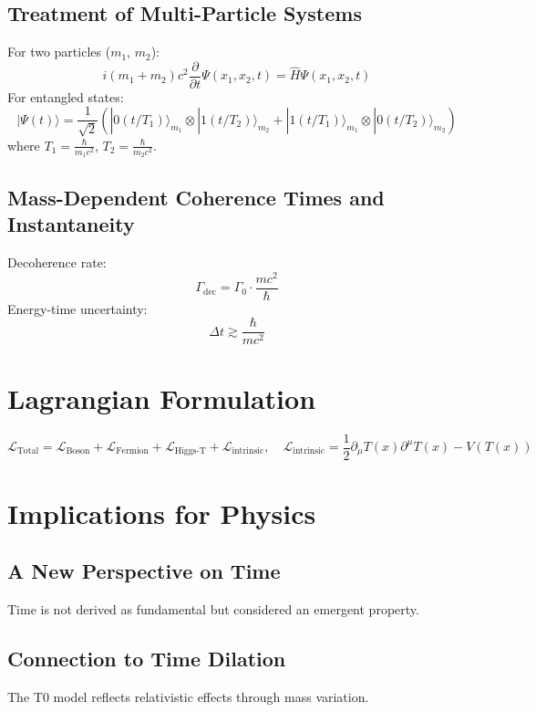 \documentclass[12pt,a4paper]{article}
\newcommand{\Tfield}{T(x)}
\begin{document}
	\subsection{Treatment of Multi-Particle Systems}
	For two particles (\( m_1 \), \( m_2 \)):
	\begin{equation}
		i (m_1 + m_2) c^2 \frac{\partial}{\partial t} \Psi(x_1, x_2, t) = \hat{H} \Psi(x_1, x_2, t)
	\end{equation}
	For entangled states:
	\begin{equation}
		|\Psi(t)\rangle = \frac{1}{\sqrt{2}}(|0(t/T_1)\rangle_{m_1} \otimes |1(t/T_2)\rangle_{m_2} + |1(t/T_1)\rangle_{m_1} \otimes |0(t/T_2)\rangle_{m_2})
	\end{equation}
	where \( T_1 = \frac{\hbar}{m_1 c^2} \), \( T_2 = \frac{\hbar}{m_2 c^2} \).
	
	\subsection{Mass-Dependent Coherence Times and Instantaneity}
	Decoherence rate:
	\begin{equation}
		\Gamma_{\text{dec}} = \Gamma_0 \cdot \frac{m c^2}{\hbar}
	\end{equation}
	Energy-time uncertainty:
	\begin{equation}
		\Delta t \gtrsim \frac{\hbar}{mc^2}
	\end{equation}
	
	\section{Lagrangian Formulation}
	\begin{equation}
		\mathcal{L}_{\text{Total}} = \mathcal{L}_{\text{Boson}} + \mathcal{L}_{\text{Fermion}} + \mathcal{L}_{\text{Higgs-T}} + \mathcal{L}_{\text{intrinsic}}, \quad \mathcal{L}_{\text{intrinsic}} = \frac{1}{2} \partial_\mu \Tfield \partial^\mu \Tfield - V(\Tfield)
	\end{equation}
	
	\section{Implications for Physics}
	\subsection{A New Perspective on Time}
	Time is not derived as fundamental but considered an emergent property.
	\subsection{Connection to Time Dilation}
	The T0 model reflects relativistic effects through mass variation.
\end{document}
